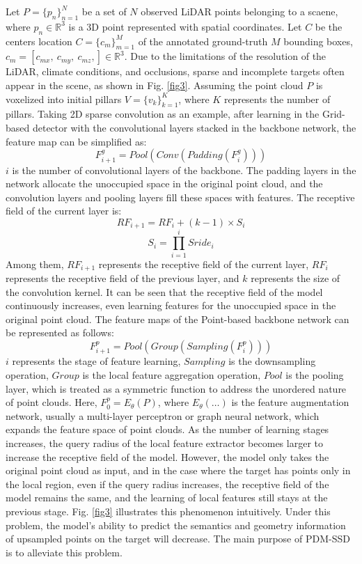 Let $P=\{p_n\}^N_{n=1}$ be a set of $N$ observed LiDAR points belonging to a scaene, where $p_n \in \mathbb{R}^{3}$ is a 3D point represented with spatial coordinates. Let $C$ be the centers location $C=\{c_m\}^M_{m=1}$ of the annotated ground-truth $M$ bounding boxes, $c_m=[c_{mx},~c_{my},~c_{mz},]\in \mathbb{R}^{3}$.
Due to the limitations of the resolution of the LiDAR, climate conditions, and occlusions, sparse and incomplete targets often appear in the scene, as shown in Fig. \ref{fig3}. Assuming the point cloud $P$ is voxelized into initial pillars $V=\{v_k\}^K_{k=1}$, where $K$ represents the number of pillars. Taking 2D sparse convolution as an example, after learning in the Grid-based detector with the convolutional layers stacked in the backbone network, the feature map can be simplified as:
\begin{equation}
	F^{g}_{i+1}=Pool(Conv(Padding(F^{g}_{i})))
\end{equation}
$i$ is the number of convolutional layers of the backbone. The padding layers in the network allocate the unoccupied space in the original point cloud, and the convolution layers and pooling layers fill these spaces with features. The receptive field of the current layer is:
\begin{equation}
	RF_{i+1}=RF_i+(k-1)\times S_i
\end{equation}
\begin{equation}
	S_i=\prod^{i}_{i=1}Sride_i
\end{equation}
Among them, $RF_{i+1}$ represents the receptive field of the current layer, $RF_i$ represents the receptive field of the previous layer, and $k$ represents the size of the convolution kernel. It can be seen that the receptive field of the model continuously increases, even learning features for the unoccupied space in the original point cloud. The feature maps of the Point-based backbone network can be represented as follows:
\begin{equation}
	\label{eq4}
	F^{p}_{i+1}=Pool(Group(Sampling(F^{p}_{i})))
\end{equation}
$i$ represents the stage of feature learning, $Sampling$ is the downsampling operation, $Group$ is the local feature aggregation operation, $Pool$ is the pooling layer, which is treated as a symmetric function to address the unordered nature of point clouds. Here, $F^{p}_{0}=E_{\theta}(P)$, where $E_{\theta}(\dots)$ is the feature augmentation network, usually a multi-layer perceptron or graph neural network, which expands the feature space of point clouds. As the number of learning stages increases, the query radius of the local feature extractor becomes larger to increase the receptive field of the model. However, the model only takes the original point cloud as input, and in the case where the target has points only in the local region, even if the query radius increases, the receptive field of the model remains the same, and the learning of local features still stays at the previous stage. Fig. \ref{fig3} illustrates this phenomenon intuitively. Under this problem, the model's ability to predict the semantics and geometry information of upsampled points on the target will decrease. The main purpose of PDM-SSD is to alleviate this problem.
